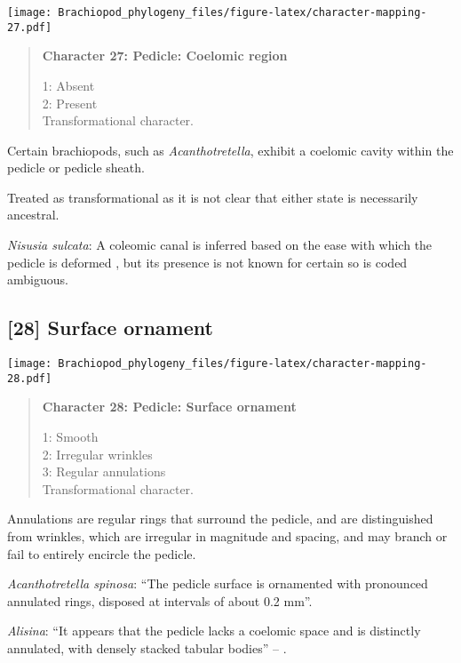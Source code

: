 \documentclass[openany]{book}
\theoremstyle{definition}
\theoremstyle{definition}
\theoremstyle{definition}
\theoremstyle{remark}
\begin{document}
\texttt{[image: Brachiopod\_phylogeny\_files/figure-latex/character-mapping-27.pdf]}

\begin{quote}
\textbf{Character 27: Pedicle: Coelomic region}

1: Absent\\
2: Present\\
Transformational character.
\end{quote}

Certain brachiopods, such as \emph{Acanthotretella}, exhibit a coelomic
cavity within the pedicle or pedicle sheath.

Treated as transformational as it is not clear that either state is
necessarily ancestral.

\hypertarget{Nisusia_sulcata-coding-27}{}
\emph{Nisusia sulcata}: A coleomic canal is inferred based on the ease
with which the pedicle is deformed
\citep{Holmer2018Evolutionarysignificance}, but its presence is not
known for certain so is coded ambiguous.

\subsection*{{[}28{]} Surface ornament}\label{surface-ornament-1}

\texttt{[image: Brachiopod\_phylogeny\_files/figure-latex/character-mapping-28.pdf]}

\begin{quote}
\textbf{Character 28: Pedicle: Surface ornament}

1: Smooth\\
2: Irregular wrinkles\\
3: Regular annulations\\
Transformational character.
\end{quote}

Annulations are regular rings that surround the pedicle, and are
distinguished from wrinkles, which are irregular in magnitude and
spacing, and may branch or fail to entirely encircle the pedicle.

\hypertarget{Acanthotretella_spinosa-coding-28}{}
\emph{Acanthotretella spinosa}: ``The pedicle surface is ornamented with
pronounced annulated rings, disposed at intervals of about 0.2 mm''.

\hypertarget{Alisina-coding-28}{}
\emph{Alisina}: ``It appears that the pedicle lacks a coelomic space and
is distinctly annulated, with densely stacked tabular bodies'' --
\citet{Zhang2011Anobolellate}.
\end{document}
